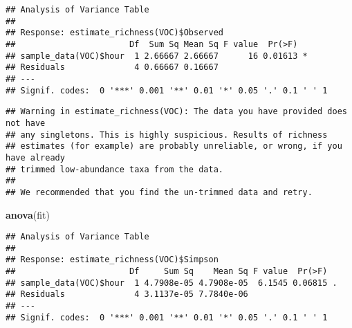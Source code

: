 \documentclass[]{article}
\newenvironment{Shaded}{\begin{snugshade}}{\end{snugshade}}
\newcommand{\KeywordTok}[1]{\textcolor[rgb]{0.13,0.29,0.53}{\textbf{#1}}}
\newcommand{\StringTok}[1]{\textcolor[rgb]{0.31,0.60,0.02}{#1}}
\newcommand{\CommentTok}[1]{\textcolor[rgb]{0.56,0.35,0.01}{\textit{#1}}}
\newcommand{\OperatorTok}[1]{\textcolor[rgb]{0.81,0.36,0.00}{\textbf{#1}}}
\newcommand{\NormalTok}[1]{#1}
\begin{document}
\begin{verbatim}
## Analysis of Variance Table
## 
## Response: estimate_richness(VOC)$Observed
##                       Df  Sum Sq Mean Sq F value  Pr(>F)  
## sample_data(VOC)$hour  1 2.66667 2.66667      16 0.01613 *
## Residuals              4 0.66667 0.16667                  
## ---
## Signif. codes:  0 '***' 0.001 '**' 0.01 '*' 0.05 '.' 0.1 ' ' 1
\end{verbatim}

\begin{Shaded}
\end{Shaded}

\begin{verbatim}
## Warning in estimate_richness(VOC): The data you have provided does not have
## any singletons. This is highly suspicious. Results of richness
## estimates (for example) are probably unreliable, or wrong, if you have already
## trimmed low-abundance taxa from the data.
## 
## We recommended that you find the un-trimmed data and retry.
\end{verbatim}

\begin{Shaded}
\begin{Highlighting}[]
\KeywordTok{anova}\NormalTok{(fit)}
\end{Highlighting}
\end{Shaded}

\begin{verbatim}
## Analysis of Variance Table
## 
## Response: estimate_richness(VOC)$Simpson
##                       Df     Sum Sq    Mean Sq F value  Pr(>F)  
## sample_data(VOC)$hour  1 4.7908e-05 4.7908e-05  6.1545 0.06815 .
## Residuals              4 3.1137e-05 7.7840e-06                  
## ---
## Signif. codes:  0 '***' 0.001 '**' 0.01 '*' 0.05 '.' 0.1 ' ' 1
\end{verbatim}
\end{document}
